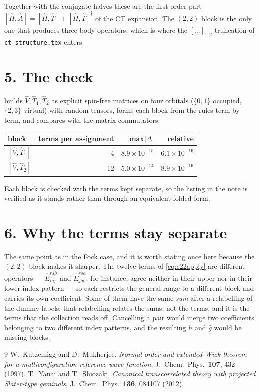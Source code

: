 \documentclass[11pt]{article}
\newcommand{\E}[2]{\hat E^{#1}_{#2}}
\newcommand{\occ}{i}
\newcommand{\vir}{a}
\begin{document}
\noindent
Together with the conjugate halves these are the first-order part
$[\hat H,\hat A]=[\hat H,\hat T]+[\hat H,\hat T]^\dagger$ of the CT expansion.
The $(2,2)$ block is the only one that produces three-body operators, which is
where the $[\dots]_{1,2}$ truncation of \texttt{ct\_structure.tex} enters.

\section*{5. The check}

 builds $\hat V,\hat T_1,\hat T_2$ as
explicit spin-free matrices on four orbitals ($\{0,1\}$ occupied, $\{2,3\}$
virtual) with random tensors, forms each block from the rules term by term, and
compares with the matrix commutators:
\begin{center}
\footnotesize
\begin{tabular}{@{}lrrr@{}}
\toprule
block & terms per assignment & max$|\Delta|$ & relative \\
\midrule
$[\hat V,\hat T_1]$ & 4 & $8.9\times10^{-15}$ & $6.1\times10^{-16}$ \\
$[\hat V,\hat T_2]$ & 12 & $5.0\times10^{-14}$ & $8.9\times10^{-16}$ \\
\bottomrule
\end{tabular}
\end{center}
Each block is checked with the terms kept separate, so the listing in the note
is verified as it stands rather than through an equivalent folded form.

\section*{6. Why the terms stay separate}

The same point as in the Fock case, and it is worth stating once here because
the $(2,2)$ block makes it sharper. The twelve terms of \eqref{eq:c22apply} are
different operators --- $\E{rs\beta}{\occ qj}$ and $\E{rs\vir}{jq\occ}$, for
instance, agree neither in their upper nor in their lower index pattern --- so
each restricts the general range to a different block and carries its own
coefficient. Some of them have the same \emph{sum} after a relabelling of the
dummy labels; that relabelling relates the sums, not the terms, and it is the
terms that the collection reads off. Cancelling a pair would merge two
coefficients belonging to two different index patterns, and the resulting
$\bar h$ and $\bar g$ would be missing blocks.

\begin{thebibliography}{9}
 W.~Kutzelnigg and D.~Mukherjee,
  \emph{Normal order and extended Wick theorem for a multiconfiguration
  reference wave function}, J.~Chem.~Phys.\ \textbf{107}, 432 (1997).
 T.~Yanai and T.~Shiozaki,
  \emph{Canonical transcorrelated theory with projected Slater-type geminals},
  J.~Chem.~Phys.\ \textbf{136}, 084107 (2012).
\end{thebibliography}
\end{document}
